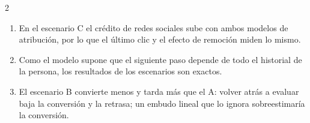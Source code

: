 \documentclass[10pt,letterpaper]{article}
\newcommand{\cas}{\framebox[1.0em]{\rule{0pt}{1.05ex}}}
\begin{document}
\begin{multicols}{2}
\begin{minipage}[t]{\columnwidth}
\begin{enumerate}[label=\cas\ \alph*),leftmargin=2.3em,itemsep=1.2pt,topsep=1pt,parsep=0pt,partopsep=0pt]
\item En el escenario C el crédito de redes sociales sube con ambos modelos de atribución, por lo que el último clic y el efecto de remoción miden lo mismo.
\item Como el modelo supone que el siguiente paso depende de todo el historial de la persona, los resultados de los escenarios son exactos.
\item El escenario B convierte menos y tarda más que el A: volver atrás a evaluar baja la conversión y la retrasa; un embudo lineal que lo ignora sobreestimaría la conversión.
\end{enumerate}\end{minipage}\par\vspace{3pt}
\end{multicols}
\end{document}
